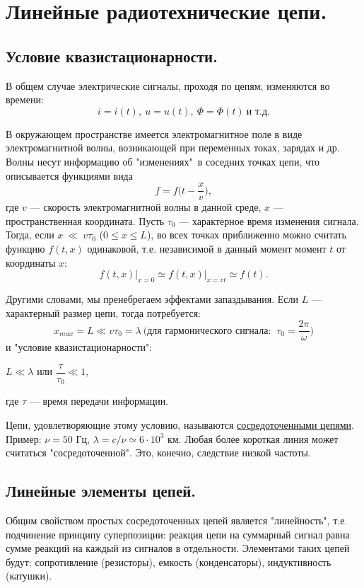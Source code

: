 \documentclass[../main/main.tex]{subfiles}
\begin{document}
\section{Линейные радиотехнические цепи.}

\subsection{Условие квазистационарности.}
В общем случае электрические сигналы, проходя по цепям, изменяются во времени: 
$$i = i(t),~u=u(t),~\Phi = \Phi(t)~\text{и т.д.}$$

В окружающем пространстве имеется электромагнитное поле в виде электромагнитной волны, возникающей при переменных токах, зарядах и др. Волны несут информацию об "изменениях"\ в соседних точках цепи, что описывается функциями вида
$$f = f\bigg(t - \dfrac{x}{v}\bigg),$$
где $v$ --- скорость электромагнитной волны в данной среде, $x$ --- пространственная координата. Пусть $\tau_0$ --- характерное время изменения сигнала. Тогда, если $x~\ll~v\tau_0$ ($0\leqslant x \leqslant L$), во всех точках приближенно можно считать функцию $f(t, x)$ одинаковой, т.е. независимой в данный момент момент $t$ от координаты $x$: 
$$f(t, x) \bigg|_{x=0} \simeq f(t, x)\bigg|_{x=vt}\simeq f(t).$$

Другими словами, мы пренебрегаем эффектами запаздывания. Если $L$ --- характерный размер цепи, тогда потребуется:
$$x_{max} = L \ll v\tau_0 = \lambda~\text{(для гармонического сигнала: }~\tau_0=\dfrac{2\pi}{\omega})$$
и "условие квазистационарности": 
\begin{center}
$\boxed{L \ll \lambda}$ или $\dfrac{\tau}{\tau_0} \ll 1$,
\end{center}
где $\tau$ --- время передачи информации.

Цепи, удовлетворяющие этому условию, называются \underline{сосредоточенными цепями}. Пример: $\nu = 50$ Гц, $\lambda = c/\nu \simeq 6\cdot10^3$ км. Любая более короткая линия может считаться "сосредоточенной". Это, конечно, следствие низкой частоты.

\subsection{Линейные элементы цепей.}

Общим свойством простых сосредоточенных цепей является "линейность", т.е. подчинение принципу суперпозиции: реакция цепи на суммарный сигнал равна сумме реакций на каждый из сигналов в отдельности. Элементами таких цепей будут: сопротивление (резисторы), емкость (конденсаторы), индуктивность (катушки).
\end{document}
